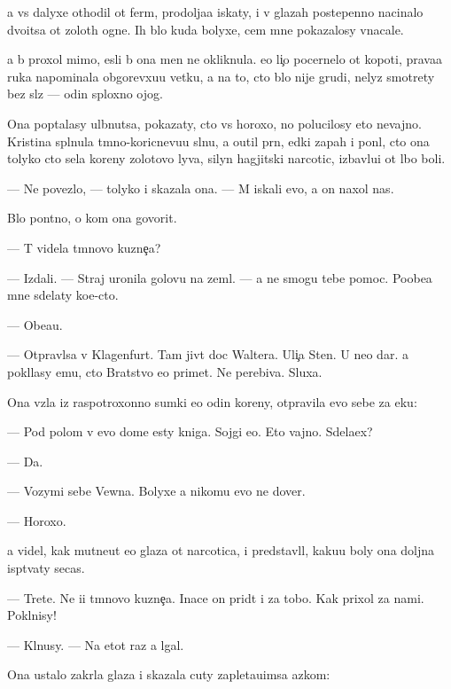 \documentclass[10pt]{book}
\begin{document}
{\Y}a vs{\e} dalyxe othodil ot ferm{\yi}, prodolja{\y}a iskaty, i v glazah postepenno nacinalo dvo{\y}itsa ot zolot{\yi}h ogne{\y}. Ih b{\yi}lo kuda bolyxe, cem mne pokazalosy vnacale.

{\Y}a b{\yi} proxol mimo, {\y}esli b{\yi} ona men{\ia} ne okliknula. {\Y}e{\y}o li{\c}o pocernelo ot kopoti, prava{\y}a ruka napominala obgorevxu{\y}u vetku, a na to, cto b{\yi}lo nije grudi, nelyz{\ia} smotrety bez sl{\e}z — odin sploxno{\y} ojog.

Ona pop{\yi}talasy ul{\yi}bnutsa, pokazaty, cto vs{\e} horoxo, no polucilosy eto nevajno. Kristina spl{\io}nula t{\e}mno-koricnevu{\y}u sl{\io}nu, {\y}a o{\x}util pr{\ia}n{\yi}{\y}, {\y}edki{\y} zapah i pon{\ia}l, cto ona tolyko cto s{\y}ela koreny zolotovo lyva, silyn{\yi}{\y} hagjitski{\y} narcotic, izbavl{\ia}{\y}u{\x}i{\y} ot l{\io}bo{\y} boli.

— Ne povezlo, — tolyko i skazala ona. — M{\yi} iskali {\y}evo, a on naxol nas.

B{\yi}lo pon{\ia}tno, o kom ona govorit.

— T{\yi} videla t{\e}mnovo kuzne{\c}a?

— Izdali. — Straj uronila golovu na zeml{\io}. — {\Y}a ne smogu tebe pomoc. Poobe{\x}a{\y} mne sdelaty ko{\y}e-cto.

— Obe{\x}a{\y}u.

— Otpravl{\ia}{\y}sa v Klagenfurt. Tam jiv{\e}t doc Waltera. Uli{\c}a Sten{\yi}. U ne{\y}o dar. {\Y}a pokl{\ia}lasy {\y}emu, cto Bratstvo {\y}e{\y}o primet. Ne perebiva{\y}. Sluxa{\y}.

Ona vz{\ia}la iz raspotroxonno{\y} sumki {\y}e{\x}o odin koreny, otpravila {\y}evo sebe za {\x}eku:

— Pod polom v {\y}evo dome {\y}esty kniga. Sojgi {\y}e{\y}o. Eto vajno. Sdela{\y}ex?

— Da.

— Vozymi sebe Vewna. Bolyxe {\y}a nikomu {\y}evo ne dover{\io}.

— Horoxo.

{\Y}a videl, kak mutne{\y}ut {\y}e{\y}o glaza ot narcotica, i predstavl{\ia}l, kaku{\y}u boly ona doljna isp{\yi}t{\yi}vaty se{\y}cas.

— Tret{\y}e. Ne i{\x}i t{\e}mnovo kuzne{\c}a. Inace on prid{\e}t i za tobo{\y}. Kak prixol za nami. Pokl{\ia}nisy!

— Kl{\ia}nusy. — Na etot raz {\y}a lgal.

Ona ustalo zakr{\yi}la glaza i skazala cuty zapleta{\y}u{\x}imsa {\y}az{\yi}kom:
\end{document}
